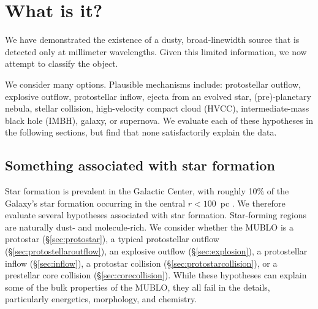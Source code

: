 \documentclass[]{aastex631}
\begin{document}
\clearpage
\section{What is it?}
\label{sec:WhatIsIt}

We have demonstrated the existence of a dusty, broad-linewidth source that is detected only at millimeter wavelengths.
Given this limited information, we now attempt to classify the object.

We consider many options.  Plausible mechanisms include:
    protostellar outflow,
    explosive outflow,
    protostellar inflow,
    ejecta from an evolved star,
    (pre)-planetary nebula,
    stellar collision,
    high-velocity compact cloud (HVCC),
    intermediate-mass black hole (IMBH),
    galaxy,
    or supernova.
We evaluate each of these hypotheses in the following sections, but find that none satisfactorily explain the data.

\subsection{Something associated with star formation}
\label{sec:starformation}
Star formation is prevalent in the Galactic Center, with roughly 10\% of the Galaxy's star formation occurring in the central $r<100$~pc \citep{Longmore2013,Barnes2017,Henshaw2023}.
We therefore evaluate several hypotheses associated with star formation.
Star-forming regions are naturally dust- and molecule-rich.
We consider whether the MUBLO is a protostar (\S \ref{sec:protostar}), a typical protostellar outflow (\S \ref{sec:protostellaroutflow}), an explosive outflow (\S \ref{sec:explosion}), a protostellar inflow (\S \ref{sec:inflow}), a protostar collision (\S \ref{sec:protostarcollision}), or a prestellar core collision (\S \ref{sec:corecollision}).
While these hypotheses can explain some of the bulk properties of the MUBLO, they all fail in the details, particularly energetics, morphology, and chemistry.
\end{document}
